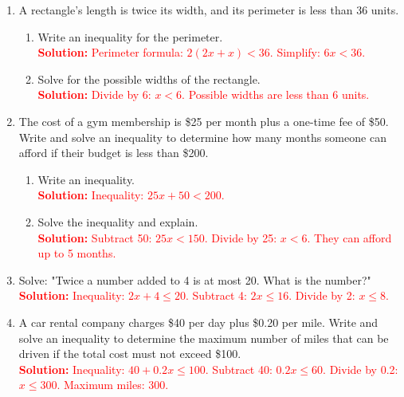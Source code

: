 \documentclass[12pt]{article}
\begin{document}
\begin{tcolorbox}[colframe=black!60, colback=white, 
coltitle=black, colbacktitle=black!15, fonttitle=\bfseries\Large, 
title=Problems, halign title=center, left=10pt, right=10pt, top=10pt, bottom=100pt]
\begin{enumerate}[start=9, itemsep=3em]
    \item A rectangle's length is twice its width, and its perimeter is less than 36 units.
    \begin{enumerate}[label=(\alph*)]
        \item Write an inequality for the perimeter.\\
        \textcolor{red}{\textbf{Solution:} Perimeter formula: \( 2(2x + x) < 36 \). Simplify: \( 6x < 36 \).}

        \item Solve for the possible widths of the rectangle.\\
        \textcolor{red}{\textbf{Solution:} Divide by 6: \( x < 6 \). Possible widths are less than 6 units.}
    \end{enumerate}

    \item The cost of a gym membership is \$25 per month plus a one-time fee of \$50. Write and solve an inequality to determine how many months someone can afford if their budget is less than \$200.
    \begin{enumerate}[label=(\alph*)]
        \item Write an inequality.\\
        \textcolor{red}{\textbf{Solution:} Inequality: \( 25x + 50 < 200 \).}

        \item Solve the inequality and explain.\\
        \textcolor{red}{\textbf{Solution:} Subtract 50: \( 25x < 150 \). Divide by 25: \( x < 6 \). They can afford up to 5 months.}
    \end{enumerate}

    \item Solve: "Twice a number added to 4 is at most 20. What is the number?"\\
    \textcolor{red}{\textbf{Solution:} Inequality: \( 2x + 4 \leq 20 \). Subtract 4: \( 2x \leq 16 \). Divide by 2: \( x \leq 8 \).}

    \item A car rental company charges \$40 per day plus \$0.20 per mile. Write and solve an inequality to determine the maximum number of miles that can be driven if the total cost must not exceed \$100.\\
    \textcolor{red}{\textbf{Solution:} Inequality: \( 40 + 0.2x \leq 100 \). Subtract 40: \( 0.2x \leq 60 \). Divide by 0.2: \( x \leq 300 \). Maximum miles: 300.}


\end{enumerate}
\end{tcolorbox}
\end{document}
